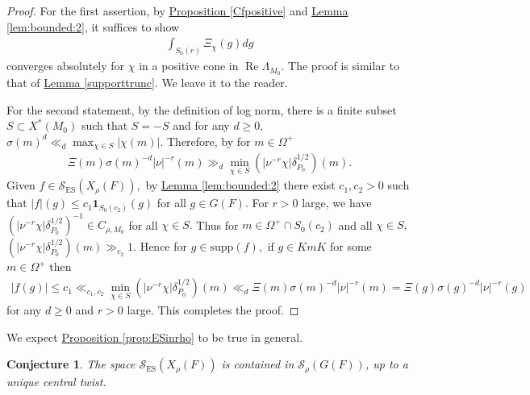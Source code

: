 \documentclass[10pt]{amsart}
\newtheorem{conjecture}[theorem]{Conjecture}
\theoremstyle{definition}
\numberwithin{equation}{section}
\numberwithin{equation}{subsection}
\newcommand{\QQ}{\mathbb{Q}}
\renewcommand{\Re}{\mathop{\mathrm{Re}}}
\begin{document}
\begin{proof}
   For the first assertion, by \hyperref[Cfpositive]{Proposition \ref{Cfpositive}} and \hyperref[lem:bounded]{Lemma \ref{lem:bounded:2}}, it suffices to show
   \begin{align*}
       \int_{S_0(r)} \Xi_\chi(g)dg
   \end{align*}
   converges absolutely for $\chi$ in a positive cone in $\Re \Lambda_{M_0}$. The proof is similar to that of \hyperref[supporttrunc]{Lemma \ref{supporttrunc}}. We leave it to the reader.

   For the second statement, by the definition of log norm, there is a finite subset $S\subset X^\ast(M_0)$ such that $S=-S$ and for any $d\ge 0,$ $\sigma(m)^d\ll_d \max_{\chi \in S} |\chi(m)|.$ Therefore, by \cite[Lemme II.1.1]{Waldspurger:Plancherel} for $m\in \Omega^+$
   \begin{align*}
       \Xi(m)\sigma(m)^{-d}|\nu|^{-r}(m)\gg_d \min_{\chi\in S} (|\nu^{-r}\chi|\delta_{P_0}^{1/2})(m).
   \end{align*}
   Given $f\in \mathcal{S}_{\mathrm{ES}}(X_\rho(F)),$ by \hyperref[lem:bounded]{Lemma \ref{lem:bounded:2}} there exist $c_1,c_2>0$ such that $|f|(g)\le c_1\mathbf{1}_{S_0(c_2)}(g)$ for all $g\in G(F).$ For $r>0$ large, we have $\left(|\nu^{-r}\chi|\delta_{P_0}^{1/2}\right)^{-1}\in C_{\rho,M_0}$ for all $\chi\in S.$ Thus for $m\in \Omega^+\cap S_0(c_2)$ and all $\chi\in S,$ $(|\nu^{-r}\chi|\delta_{P_0}^{1/2})(m)\gg_{c_2} 1.$ Hence for $g\in \mathrm{supp}(f),$ if $g\in KmK$ for some $m\in \Omega^+$ then
   \begin{align*}
      |f(g)|\le c_1\ll_{c_1,c_2} \min_{\chi\in S} (|\nu^{-r}\chi|\delta_{P_0}^{1/2})(m)\ll_d \Xi(m)\sigma(m)^{-d}|\nu|^{-r}(m)=\Xi(g)\sigma(g)^{-d}|\nu|^{-r}(g)
   \end{align*}
   for any $d\ge 0$ and $r>0$ large. This completes the proof.
\end{proof}

We expect \hyperref[prop:ESinrho]{Proposition \ref{prop:ESinrho}} to be true in general.

\begin{conjecture}  \label{conj:local}
The space $\mathcal{S}_{\mathrm{ES}}(X_\rho(F))$ is contained in $\mathcal{S}_\rho(G(F))$, up to a unique central twist.
\end{conjecture}
\end{document}
